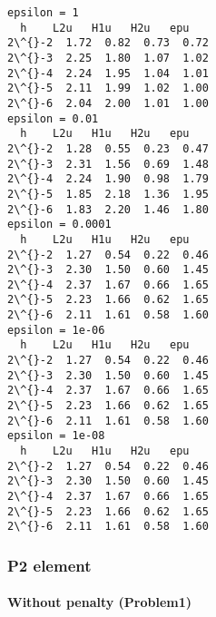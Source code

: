 \documentclass[11pt]{article}
\begin{document}
    \begin{Verbatim}[commandchars=\\\{\}]
epsilon = 1
  h    L2u   H1u   H2u   epu
2\^{}-2  1.72  0.82  0.73  0.72
2\^{}-3  2.25  1.80  1.07  1.02
2\^{}-4  2.24  1.95  1.04  1.01
2\^{}-5  2.11  1.99  1.02  1.00
2\^{}-6  2.04  2.00  1.01  1.00
epsilon = 0.01
  h    L2u   H1u   H2u   epu
2\^{}-2  1.28  0.55  0.23  0.47
2\^{}-3  2.31  1.56  0.69  1.48
2\^{}-4  2.24  1.90  0.98  1.79
2\^{}-5  1.85  2.18  1.36  1.95
2\^{}-6  1.83  2.20  1.46  1.80
epsilon = 0.0001
  h    L2u   H1u   H2u   epu
2\^{}-2  1.27  0.54  0.22  0.46
2\^{}-3  2.30  1.50  0.60  1.45
2\^{}-4  2.37  1.67  0.66  1.65
2\^{}-5  2.23  1.66  0.62  1.65
2\^{}-6  2.11  1.61  0.58  1.60
epsilon = 1e-06
  h    L2u   H1u   H2u   epu
2\^{}-2  1.27  0.54  0.22  0.46
2\^{}-3  2.30  1.50  0.60  1.45
2\^{}-4  2.37  1.67  0.66  1.65
2\^{}-5  2.23  1.66  0.62  1.65
2\^{}-6  2.11  1.61  0.58  1.60
epsilon = 1e-08
  h    L2u   H1u   H2u   epu
2\^{}-2  1.27  0.54  0.22  0.46
2\^{}-3  2.30  1.50  0.60  1.45
2\^{}-4  2.37  1.67  0.66  1.65
2\^{}-5  2.23  1.66  0.62  1.65
2\^{}-6  2.11  1.61  0.58  1.60
    \end{Verbatim}

    \subsubsection{P2 element}\label{p2-element}

    \paragraph{Without penalty (Problem1)}\label{without-penalty-problem1}
\end{document}
